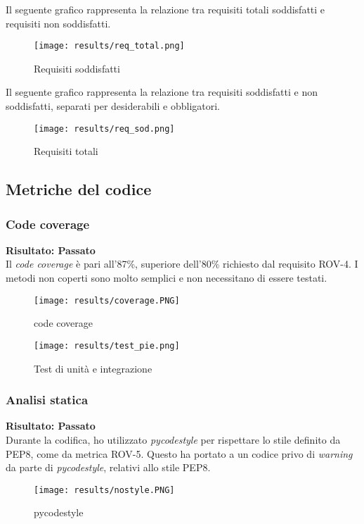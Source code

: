 Il seguente grafico rappresenta la relazione tra requisiti totali soddisfatti e requisiti non soddisfatti.
\begin{figure}[H]
    \centering
    \texttt{[image: results/req\_total.png]}
    \caption{Requisiti soddisfatti}
    \label{img:req_soddisfatti}
\end{figure}

Il seguente grafico rappresenta la relazione tra requisiti soddisfatti e non soddisfatti, separati per desiderabili e obbligatori.
\begin{figure}[H]
    \centering
    \texttt{[image: results/req\_sod.png]}
    \caption{Requisiti totali}
    \label{img:req_totali}
\end{figure}

\subsection{Metriche del codice} %
\subsubsection{Code coverage} %
\textbf{Risultato: Passato}\\
Il \textit{code coverage} è pari all'87\%, superiore dell'80\% richiesto dal requisito ROV-4. I metodi non coperti sono molto semplici e non necessitano di essere testati.
\begin{figure}[H]
    \centering
    \texttt{[image: results/coverage.PNG]} 
    \caption{code coverage}
    \label{coverage}
\end{figure}
\begin{figure}[H]
    \centering
    \texttt{[image: results/test\_pie.png]} 
    \caption{Test di unità e integrazione}
    \label{img:unittests}
\end{figure}

\subsubsection{Analisi statica} %
\textbf{Risultato: Passato}\\
Durante la codifica, ho utilizzato \textit{pycodestyle} per rispettare lo stile definito da PEP8, come da metrica ROV-5. Questo ha portato a un codice privo di \textit{warning} da parte di \textit{pycodestyle}, relativi allo stile PEP8.
\begin{figure}[H]
    \centering
    \texttt{[image: results/nostyle.PNG]} 
    \caption{pycodestyle}
    \label{nosecov}
\end{figure}

